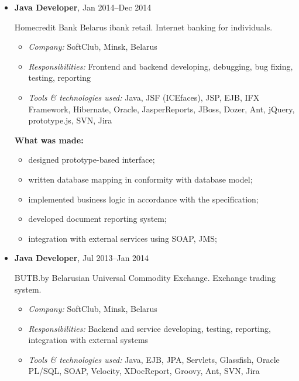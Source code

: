 \documentclass[a4paper, 12pt]{article}
\newcommand{\position}[1]{
    \textbf{#1}}
\newcommand{\itemlabel}[1]{
    \textit{#1:}}
\begin{document}
\begin{itemize}
        \item \position{Java Developer}, Jan 2014--Dec 2014

           Homecredit Bank Belarus ibank retail. Internet banking for individuals. 

            \begin{itemize}
                \item \itemlabel{Company} SoftClub, Minsk, Belarus
                \item \itemlabel{Responsibilities} Frontend and backend developing, debugging, bug fixing, testing, reporting
                \item \itemlabel{Tools \& technologies used} Java, JSF (ICEfaces), JSP, EJB, IFX Framework, Hibernate, Oracle, JasperReports, JBoss, Dozer, Ant, jQuery, prototype.js, SVN, Jira
            \end{itemize}
            
               \textbf{What was made:}
			\begin{itemize}
  				\item designed prototype-based interface;
  				\item written database mapping in conformity with database model;
  				\item implemented business logic in accordance with the specification;
				\item developed document reporting system;
  				\item integration with external services using SOAP, JMS;
			\end{itemize}


        \item \position{Java Developer}, Jul 2013--Jan 2014

            BUTB.by Belarusian Universal Commodity Exchange. Exchange trading system.

            \begin{itemize}
                \item \itemlabel{Company} SoftClub, Minsk, Belarus
                \item \itemlabel{Responsibilities} Backend and service developing, testing, reporting, integration with external systems
                \item \itemlabel{Tools \& technologies used} Java, EJB, JPA, Servlets, Glassfish, Oracle PL/SQL, SOAP, Velocity, XDocReport, Groovy, Ant, SVN, Jira
            \end{itemize}
            

\end{itemize}
\end{document}
